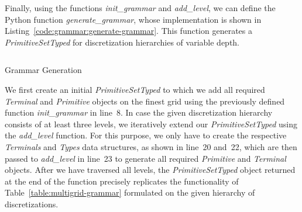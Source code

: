 Finally, using the functions \emph{init\_grammar} and \emph{add\_level}, we can define the Python function \emph{generate\_grammar}, whose implementation is shown in Listing~\ref{code:grammar:generate-grammar}. 
This function generates a \emph{PrimitiveSetTyped} for discretization hierarchies of variable depth.
\begin{listing}
	\inputminted[linenos]{python}{evostencils/grammar/generate_grammar.py}
	\caption{Grammar Generation}
	\label{code:grammar:generate-grammar}
\end{listing}
We first create an initial \emph{PrimitiveSetTyped} to which we add all required \emph{Terminal} and \emph{Primitive} objects on the finest grid using the previously defined function \emph{init\_grammar} in line~8.
In case the given discretization hierarchy consists of at least three levels, we iteratively extend our \emph{PrimitiveSetTyped} using the \emph{add\_level} function.
For this purpose, we only have to create the respective \emph{Terminals} and \emph{Types} data structures, as shown in line~20 and~22, which are then passed to \emph{add\_level} in line~23 to generate all required \emph{Primitive} and \emph{Terminal} objects.
After we have traversed all levels, the \emph{PrimitiveSetTyped} object returned at the end of the function precisely replicates the functionality of Table~\ref{table:multigrid-grammar} formulated on the given hierarchy of discretizations.


